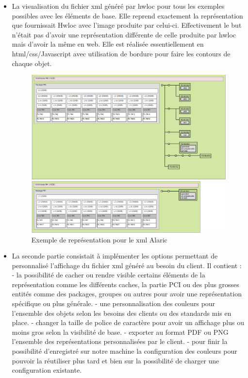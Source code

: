 \documentclass [a4paper,11pt]{article}
\begin{document}
\begin{itemize}
\item La visualisation du fichier xml généré par hwloc pour tous les exemples possibles avec les éléments de base. Elle reprend exactement la représentation que fournissait Hwloc avec l'image produite par celui-ci. Effectivement le but n'était pas d'avoir une représentation différente de celle produite par hwloc mais d'avoir la même en web. Elle est réalisée essentiellement en html/css/Javascript avec utilisation de bordure pour faire les contours de chaque objet. 

\begin{figure}[!h]
\centering
\includegraphics[scale=0.5]{img/alaric.png}
\caption[Résultats]{Exemple de représentation pour le xml Alaric}
\end{figure}

\item La seconde partie consistait à implémenter les options permettant de personnalisé l'affichage du fichier xml généré au besoin du client. Il contient : \newline
- la possibilité de cacher ou rendre visible certains éléments de la représentation comme les différents caches, la partie PCI ou des plus grosses entités comme des packages, groupes ou autres pour avoir une représentation spécifique ou plus générale. \newline
- une personnalisation des couleurs pour l'ensemble des objets selon les besoins des clients ou des standards mis en place. \newline
- changer la taille de police de caractère pour avoir un affichage plus ou moins gros selon la visibilité de base. \newline
- exporter au format PDF ou PNG l'ensemble des représentations personnalisées par le client.
- pour finir la possibilité d'enregistré sur notre machine la configuration des couleurs pour pouvoir la réutiliser plus tard et bien sur la possibilité de charger une configuration existante.



\end{itemize}
\end{document}
